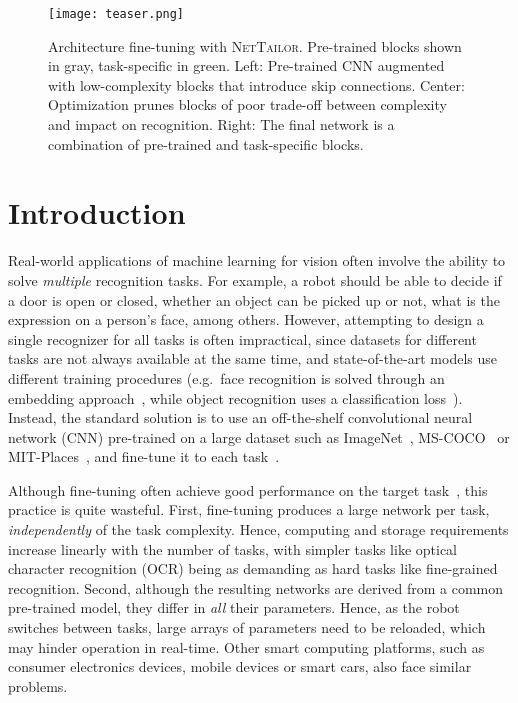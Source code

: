 \documentclass[10pt,twocolumn,letterpaper]{article}
\begin{document}
\begin{figure}[t!]
    \centering
    \texttt{[image: teaser.png]}
    \caption{Architecture fine-tuning with \textsc{NetTailor}. Pre-trained blocks shown in gray, task-specific in green. Left: Pre-trained CNN augmented with low-complexity blocks that introduce skip connections.
    Center: Optimization prunes blocks of poor trade-off between complexity and impact on recognition. Right: The final network is a combination of pre-trained and task-specific blocks.}
    \label{fig:teaser}
\end{figure}

\abovedisplayskip=5pt
\belowdisplayskip=5pt

\vspace{-3pt}
\section{Introduction}
\vspace{-3pt}
Real-world applications of machine learning for vision often involve the ability to solve \textit{multiple} recognition tasks.
For example, a robot should be able to decide if a door is open or closed, whether an object can be picked up or not, what is the expression on a person's face, among others.
However, attempting to design a single recognizer for all tasks is often impractical, since datasets for different tasks are not always available at the same time, and state-of-the-art models use different training procedures (e.g.~face recognition is solved through an embedding approach~\cite{schroff2015facenet}, while object recognition uses a classification loss~\cite{he2016deep}).
Instead, the standard solution is to use an off-the-shelf convolutional neural network (CNN) pre-trained on a large dataset such as ImageNet~\cite{imagenet}, MS-COCO~\cite{coco} or MIT-Places~\cite{places}, and fine-tune it to each task~\cite{yosinski2014transferable, krizhevsky2012imagenet, girshick2014rich}.

Although fine-tuning often achieve good performance on the target task~\cite{yosinski2014transferable}, this practice is quite wasteful.
First, fine-tuning produces a large network per task, {\it independently\/} of the task complexity. Hence, computing and storage requirements increase linearly with the number of tasks, with simpler tasks like optical character recognition (OCR) being as demanding as hard tasks like fine-grained recognition.
Second, although the resulting networks are derived from a common pre-trained model, they differ in {\it all\/} their parameters. Hence, as the robot switches between tasks, large arrays of parameters need to be reloaded, which may hinder operation in real-time.
Other smart computing platforms, such as consumer electronics devices, mobile devices or smart cars, also face similar problems.
\end{document}
